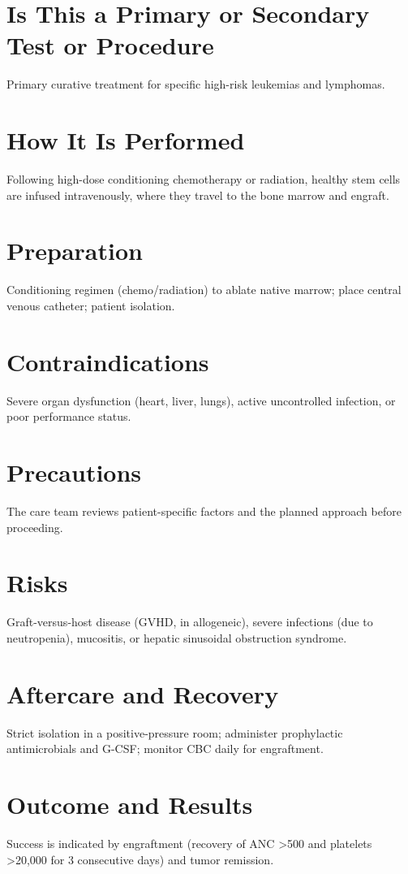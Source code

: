 \section*{Is This a Primary or Secondary Test or Procedure}
Primary curative treatment for specific high-risk leukemias and lymphomas.

\section*{How It Is Performed}
Following high-dose conditioning chemotherapy or radiation, healthy stem cells are infused intravenously, where they travel to the bone marrow and engraft.

\section*{Preparation}
Conditioning regimen (chemo/radiation) to ablate native marrow; place central venous catheter; patient isolation.

\section*{Contraindications}
Severe organ dysfunction (heart, liver, lungs), active uncontrolled infection, or poor performance status.

\section*{Precautions}
The care team reviews patient-specific factors and the planned approach before proceeding.

\section*{Risks}
Graft-versus-host disease (GVHD, in allogeneic), severe infections (due to neutropenia), mucositis, or hepatic sinusoidal obstruction syndrome.

\section*{Aftercare and Recovery}
Strict isolation in a positive-pressure room; administer prophylactic antimicrobials and G-CSF; monitor CBC daily for engraftment.

\section*{Outcome and Results}
Success is indicated by engraftment (recovery of ANC >500 and platelets >20,000 for 3 consecutive days) and tumor remission.

